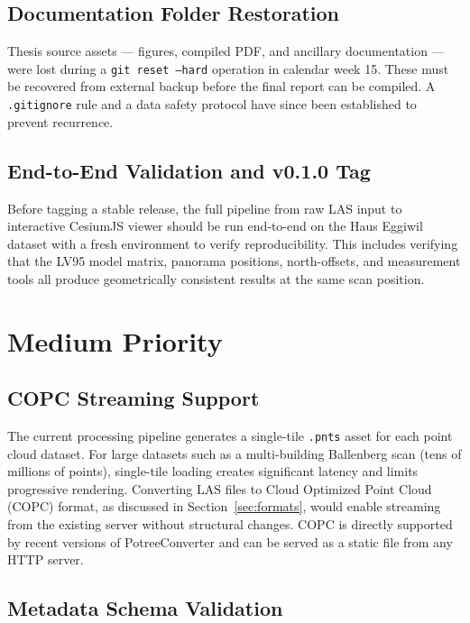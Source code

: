 \subsection{Documentation Folder Restoration}

Thesis source assets — figures, compiled PDF, and ancillary documentation
— were lost during a \texttt{git reset --hard} operation in calendar
week 15. These must be recovered from external backup before the final report
can be compiled. A \texttt{.gitignore} rule and a data safety protocol have
since been established to prevent recurrence.

\subsection{End-to-End Validation and v0.1.0 Tag}

Before tagging a stable release, the full pipeline from raw LAS input to
interactive CesiumJS viewer should be run end-to-end on the Haus Eggiwil
dataset with a fresh environment to verify reproducibility. This includes
verifying that the LV95 model matrix, panorama positions, north-offsets, and
measurement tools all produce geometrically consistent results at the same
scan position.

\section{Medium Priority}
\label{sec:tasks_medium}

\subsection{COPC Streaming Support}

The current processing pipeline generates a single-tile \texttt{.pnts} asset
for each point cloud dataset. For large datasets such as a multi-building
Ballenberg scan (tens of millions of points), single-tile loading creates
significant latency and limits progressive rendering. Converting LAS files to
Cloud Optimized Point Cloud (COPC) format, as discussed in
Section~\ref{sec:formats}, would enable streaming from the existing server
without structural changes. COPC is directly supported by recent versions of
PotreeConverter and can be served as a static file from any HTTP server.

\subsection{Metadata Schema Validation}

